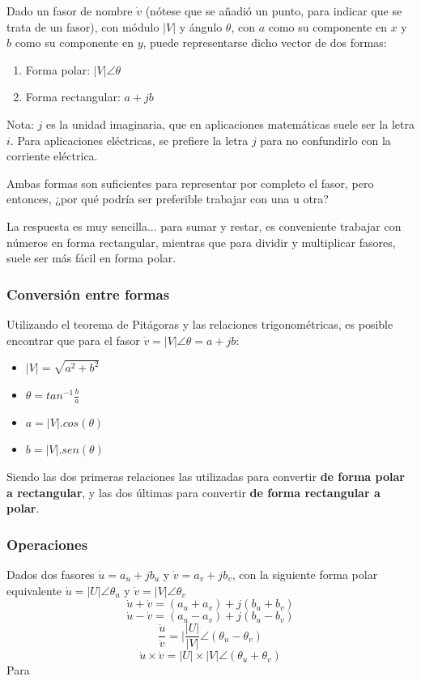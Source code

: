 Dado un fasor de nombre $\dot{v}$ (nótese que se añadió un punto, para indicar que se trata de un fasor), con módulo $|V|$ y ángulo $\theta$, con $a$ como su componente en $x$ y $b$ como su componente en $y$, puede representarse dicho vector de dos formas:

\begin{enumerate}
	\item Forma polar: $|V| \angle \theta$
	\item Forma rectangular: $a+jb$
\end{enumerate}

Nota: $j$ es la unidad imaginaria, que en aplicaciones matemáticas suele ser la letra $i$. Para aplicaciones eléctricas, se prefiere la letra $j$ para no confundirlo con la corriente eléctrica.

Ambas formas son suficientes para representar por completo el fasor, pero entonces, ¿por qué podría ser preferible trabajar con una u otra? 

La respuesta es muy sencilla... para sumar y restar, es conveniente trabajar con números en forma rectangular, mientras que para dividir y multiplicar fasores, suele ser más fácil en forma polar.

\subsubsection{Conversión entre formas}

Utilizando el teorema de Pitágoras y las relaciones trigonométricas, es posible encontrar que para el fasor $\dot{v}=|V| \angle \theta=a+jb$:
\begin{itemize}
	\item $|V|=\sqrt{a^{2}+b^{2}}$
	\item $\theta = tan^{-1}\frac{b}{a}$
	\item $a=|V|.cos(\theta)$
	\item $b=|V|.sen(\theta)$
\end{itemize}

Siendo las dos primeras relaciones las utilizadas para convertir \textbf{de forma polar a rectangular}, y las dos últimas para convertir \textbf{de forma rectangular a polar}.

\subsubsection{Operaciones}

Dados dos fasores $\dot{u}=a_u+jb_u$ y $\dot{v}=a_v+jb_v$, con la siguiente forma polar equivalente $\dot{u}=|U| \angle \theta_u$ y  $\dot{v}=|V| \angle \theta_v$
$$\dot{u}+\dot{v}= (a_u+a_v)+j(b_u+b_v)$$
$$\dot{u}-\dot{v}= (a_u-a_v)+j(b_u-b_v)$$
$$\frac{\dot{u}}{\dot{v}}=|\frac{|U|}{|V|} \angle (\theta_u - \theta_v )$$
$$\dot{u}\times \dot{v}=|U| \times |V| \angle (\theta_u + \theta_v )$$
Para

